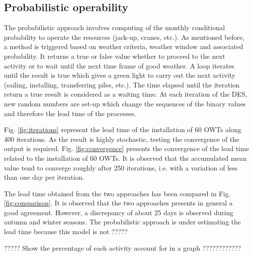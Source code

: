 \subsection{Probabilistic operability}
The probabilistic approach involves computing of the monthly conditional probability to operate the resources (jack-up, cranes, etc.). As mentioned before, a method is triggered based on weather criteria, weather window and associated probability. It returns a true or false value whether to proceed to the next activity or to wait until the next time frame of good weather. A loop iterates until the result is true which gives a green light to carry out the next activity (sailing, installing, transferring piles, etc.). The time elapsed until the iteration return a true result is considered as a waiting time. At each iteration of the DES, new random numbers are set-up which change the sequences of the binary values and therefore the lead time of the processes.

Fig. \ref{fig:iterations} represent the lead time of the installation of 60 OWTs along 400 iterations. As the result is highly stochastic, testing the convergence of the output is required. Fig. \ref{fig:convergence} presents the convergence of the lead time related to the installation of 60 OWTs. It is observed that the accumulated mean value tend to converge roughly after 250 iterations, i.e. with a variation of less than one day per iteration.

The lead time obtained from the two approaches has been compared in Fig. \ref{fig:comparison}. It is observed that the two approaches presents in general a good agreement. However, a discrepancy of about 25 days is observed during autumn and winter seasons. The probabilistic approach is under estimating the lead time because this model is not ?????

????? Show the percentage of each activity account for in a graph ????????????